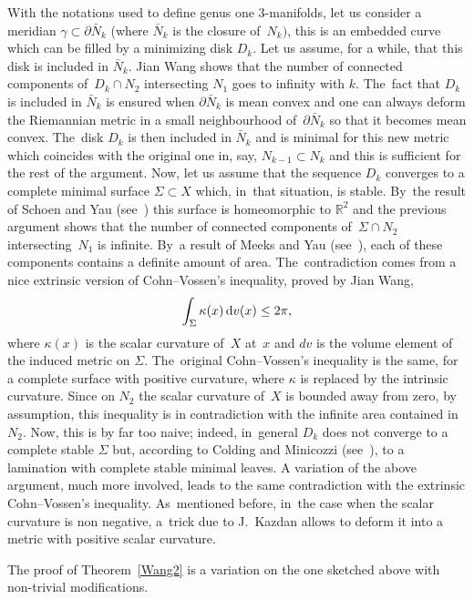 \documentclass[10pt,a4paper]{amsart}
\numberwithin{equation}{section}
\begin{document}
 With the notations used to define genus one $3$-manifolds, let us consider a meridian $\gamma\subset\partial {\bar N}_k$ (where $\bar N_k$ is the
closure of~$N_k)$, this is an embedded curve which can be filled by a minimizing disk $D_k$. Let us assume, for a while, that this disk is included in $\bar N_k$. Jian Wang shows that the number of connected components of~$D_k\cap N_2$ intersecting $N_1$ goes to infinity with $k$. The~fact that $D_k$ is included in $\bar N_k$ is ensured when $\partial \bar N_k$ is mean convex and one can always deform the Riemannian metric in a small neighbourhood of~$\partial \bar N_k$ so that it becomes mean convex. The~disk $D_k$ is then included in $\bar N_k$ and is minimal for this new metric which coincides with the original one in, say, $N_{k-1}\subset N_k$ and this is sufficient for the rest of the argument. Now, let us assume that the sequence $D_k$ converges to a complete minimal surface $\Sigma\subset X$ which, in~that situation, is stable. By~the result of Schoen and Yau (see~\cite{SchoenYau:stable}) this surface is homeomorphic to $\mathbb{R}^2$ and the previous argument shows that the number of connected components of~$\Sigma\cap N_2$ intersecting~$N_1$ is infinite. By~a result of Meeks and Yau (see~\cite{Mee-Yau}), each of these components contains a definite amount of area. The~contradiction comes from a nice extrinsic version of Cohn--Vossen's inequality, proved by Jian Wang,
\[
\int_\Sigma \kappa (x)\,{\rm d} v(x) \leq 2\pi,
\]
where $\kappa (x)$ is the scalar curvature of~$X$ at~$x$ and $dv$ is the volume element of the induced metric on $\Sigma$. The~original Cohn--Vossen's inequality is the same, for a complete surface with positive curvature, where $\kappa$ is replaced by the intrinsic curvature. Since on $N_2$ the scalar curvature of~$X$ is bounded away from zero, by assumption, this inequality is in contradiction with the infinite area contained in~$N_2$. Now, this is by far too naive; indeed, in~general $D_k$ does not converge to a complete stable $\Sigma$ but, according to Colding and Minicozzi
(see~\cite{Col-Min}), to a lamination with complete stable minimal leaves. A variation of the above argument, much more involved, leads to the same contradiction with the extrinsic Cohn--Vossen's inequality. As~mentioned before, in~the case when the scalar curvature is non negative, a~trick
due to J.~Kazdan allows to deform it into a metric with positive scalar curvature.

The proof of Theorem~\ref{Wang2} is a variation on the one sketched above
with non-trivial modifications.
\end{document}
